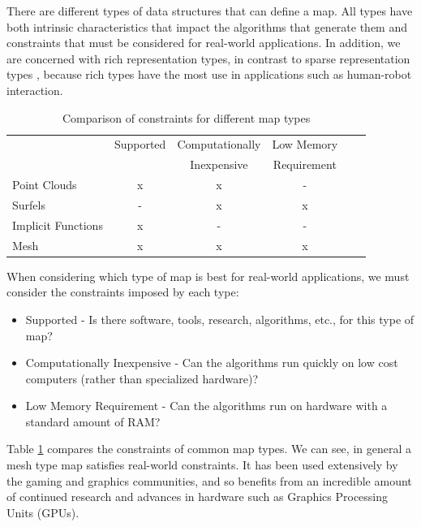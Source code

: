 There are different types of data structures that can define a map. All types
have both intrinsic characteristics that impact the algorithms that generate
them and constraints that must be considered for real-world applications. In
addition, we are concerned with rich representation types, in contrast to sparse
representation types \cite{Dissanayake2001}, because rich types have the most
use in applications such as human-robot interaction.

\begin{table}[h]
  \caption{Comparison of constraints for different map types}
  \label{tab:rep}
  \begin{footnotesize}
  \begin{center}
    \begin{tabular}{|l|c|c|c|c|c|}
    \hline
    \multirow{2}{*}{} & Supported & Computationally & Low Memory \\
     & & Inexpensive & Requirement \\\hline
    Point Clouds		& x & x & - \\
    Surfels             	& - & x & x \\
    Implicit Functions 	& x & - & - \\
    Mesh	 	& x & x & x \\
    \hline
    \end{tabular}
  \end{center}
  \end{footnotesize}
\end{table}

When considering which type of map is best for real-world applications, we must
consider the constraints imposed by each type:

\begin{itemize}
  \item Supported - Is there software, tools, research, algorithms, etc., for
  this type of map?
  \item Computationally Inexpensive - Can the algorithms run quickly on low cost
  computers (rather than specialized hardware)?
  \item Low Memory Requirement - Can the algorithms run on hardware with
  a standard amount of RAM?
\end{itemize}

Table \ref{tab:rep} compares the constraints of common map types. We can see, in
general a mesh type map satisfies real-world constraints. It has been used
extensively by the gaming and graphics communities, and so benefits from an
incredible amount of continued research and advances in hardware such as
Graphics Processing Units (GPUs).


